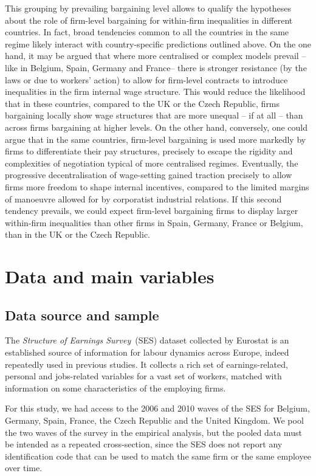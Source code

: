 \documentclass[12pt]{article}
\begin{document}
This grouping by prevailing bargaining level allows to qualify the hypotheses about the role of firm-level bargaining for within-firm inequalities in different countries. In fact, broad tendencies common to all the countries in the same regime likely interact with country-specific predictions outlined above. On the one hand, it may be argued that where more centralised or complex models prevail -- like in Belgium, Spain, Germany and France-- there is stronger resistance (by the laws or due to workers' action) to allow for firm-level contracts to introduce inequalities in the firm internal wage structure. This would reduce the likelihood that in these countries, compared to the UK or the Czech Republic, firms bargaining locally show wage structures that are more unequal -- if at all -- than across firms bargaining at higher levels. On the other hand, conversely, one could argue that in the same countries, firm-level bargaining is used more markedly by firms to differentiate their pay structures, precisely to escape the rigidity and complexities of negotiation typical of more centralised regimes. Eventually, the progressive decentralisation of wage-setting gained traction precisely to allow firms more freedom to shape internal incentives, compared to the limited margins of manoeuvre allowed for by corporatist industrial relations. If this second tendency prevails, we could expect firm-level bargaining firms to display larger within-firm inequalities than other firms in Spain, Germany, France or Belgium, than in the UK or the Czech Republic.



\section{Data and main variables}
\label{sec:data}

\subsection{Data source and sample}

The \emph{Structure of Earnings Survey}~(SES) dataset collected by Eurostat is an established source of information for labour dynamics across Europe, indeed repeatedly used in previous studies. It collects a rich set of earnings-related, personal and jobs-related variables for a vast set of workers, matched with information on some characteristics of the employing firms.

For this study, we had access to the 2006 and 2010 waves of the SES for Belgium, Germany, Spain, France, the Czech Republic and the United Kingdom. We pool the two waves of the survey in the empirical analysis, but the pooled data must be intended as a repeated cross-section, since the SES does not report any identification code that can be used to match the same firm or the same employee over time.
\end{document}
